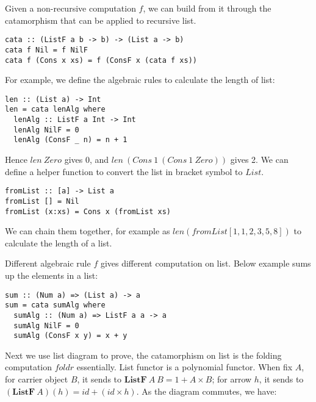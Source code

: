 \documentclass{article}
\begin{document}
\begin{example}
Given a non-recursive computation $f$, we can build from it through the catamorphism that can be applied to recursive list.

\lstset{frame=single}
\begin{lstlisting}[style=Haskell]
cata :: (ListF a b -> b) -> (List a -> b)
cata f Nil = f NilF
cata f (Cons x xs) = f (ConsF x (cata f xs))
\end{lstlisting}

For example, we define the algebraic rules to calculate the length of list:

\begin{lstlisting}[style=Haskell]
len :: (List a) -> Int
len = cata lenAlg where
  lenAlg :: ListF a Int -> Int
  lenAlg NilF = 0
  lenAlg (ConsF _ n) = n + 1
\end{lstlisting}

Hence $len\ Zero$ gives 0, and $len\ (Cons\ 1\ (Cons\ 1\ Zero))$ gives 2. We can define a helper function to convert the list in bracket symbol to $List$.

\begin{lstlisting}
fromList :: [a] -> List a
fromList [] = Nil
fromList (x:xs) = Cons x (fromList xs)
\end{lstlisting}

We can chain them together, for example as $len (fromList [1, 1, 2, 3, 5, 8])$ to calculate the length of a list.

Different algebraic rule $f$ gives different computation on list. Below example sums up the elements in a list:

\begin{lstlisting}
sum :: (Num a) => (List a) -> a
sum = cata sumAlg where
  sumAlg :: (Num a) => ListF a a -> a
  sumAlg NilF = 0
  sumAlg (ConsF x y) = x + y
\end{lstlisting}

Next we use list diagram to prove, the catamorphism on list is the folding computation $foldr$ essentially. List functor is a polynomial functor. When fix $A$, for carrier object $B$, it sends to $\mathbf{ListF}\ A\ B = 1 + A \times B$; for arrow $h$, it sends to $(\mathbf{ListF}\ A)(h) = id + (id \times h)$. As the diagram commutes, we have:


\end{example}
\end{document}
